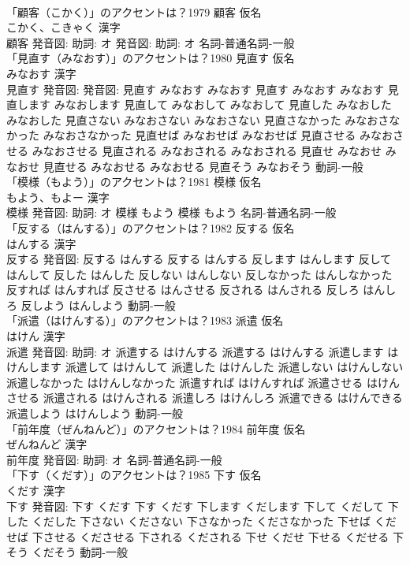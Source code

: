 \documentclass[8pt]{extreport}
\begin{document}
\begin{CJK}{UTF8}{min}
\\	「顧客（こかく）」のアクセントは？1979	顧客 仮名　
\\	こかく、こきゃく 漢字　
\\	顧客 発音図: 助詞: オ 発音図: 助詞: オ							名詞-普通名詞-一般 
\\	「見直す（みなおす）」のアクセントは？1980	見直す 仮名　
\\	みなおす 漢字　
\\	見直す 発音図: 発音図:	見直す みなおす みなおす		見直す みなおす みなおす 見直します みなおします 見直して みなおして みなおして 見直した みなおした みなおした 見直さない みなおさない みなおさない 見直さなかった みなおさなかった みなおさなかった 見直せば みなおせば みなおせば 見直させる みなおさせる みなおさせる 見直される みなおされる みなおされる 見直せ みなおせ みなおせ 見直せる みなおせる みなおせる 見直そう みなおそう				動詞-一般 
\\	「模様（もよう）」のアクセントは？1981	模様 仮名　
\\	もよう、もよー 漢字　
\\	模様 発音図: 助詞: オ	模様 もよう		模様 もよう				名詞-普通名詞-一般 
\\	「反する（はんする）」のアクセントは？1982	反する 仮名　
\\	はんする 漢字　
\\	反する 発音図:	反する はんする		反する はんする 反します はんします 反して はんして 反した はんした 反しない はんしない 反しなかった はんしなかった 反すれば はんすれば 反させる はんさせる 反される はんされる 反しろ はんしろ 反しよう はんしよう				動詞-一般 
\\	「派遣（はけんする）」のアクセントは？1983	派遣 仮名　
\\	はけん 漢字　
\\	派遣 発音図: 助詞: オ	派遣する はけんする		派遣する はけんする 派遣します はけんします 派遣して はけんして 派遣した はけんした 派遣しない はけんしない 派遣しなかった はけんしなかった 派遣すれば はけんすれば 派遣させる はけんさせる 派遣される はけんされる 派遣しろ はけんしろ 派遣できる はけんできる 派遣しよう はけんしよう				動詞-一般 
\\	「前年度（ぜんねんど）」のアクセントは？1984	前年度 仮名　
\\	ぜんねんど 漢字　
\\	前年度 発音図: 助詞: オ							名詞-普通名詞-一般 
\\	「下す（くだす）」のアクセントは？1985	下す 仮名　
\\	くだす 漢字　
\\	下す 発音図:	下す くだす		下す くだす 下します くだします 下して くだして 下した くだした 下さない くださない 下さなかった くださなかった 下せば くだせば 下させる くださせる 下される くだされる 下せ くだせ 下せる くだせる 下そう くだそう				動詞-一般 

\end{CJK}
\end{document}
